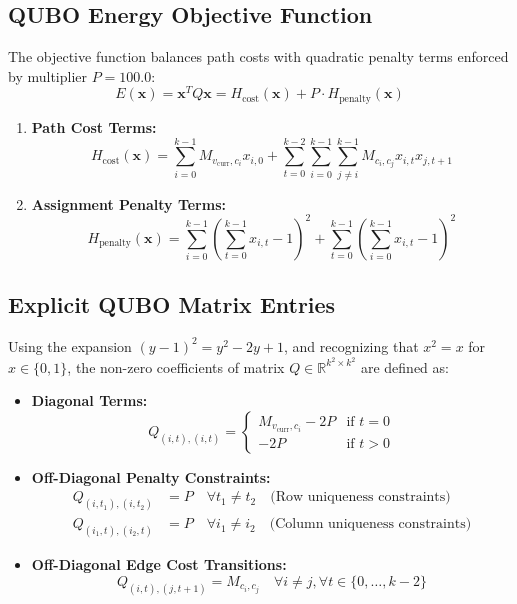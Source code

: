 \documentclass[11pt,a4paper]{article}
\begin{document}
\subsection{QUBO Energy Objective Function}
The objective function balances path costs with quadratic penalty terms enforced by multiplier $P = 100.0$:
\begin{equation}
E(\mathbf{x}) = \mathbf{x}^T Q \mathbf{x} = H_{\text{cost}}(\mathbf{x}) + P \cdot H_{\text{penalty}}(\mathbf{x})
\end{equation}

\begin{enumerate}
    \item \textbf{Path Cost Terms:}
    \begin{equation}
    H_{\text{cost}}(\mathbf{x}) = \sum_{i=0}^{k-1} M_{v_{\text{curr}}, c_i} x_{i,0} + \sum_{t=0}^{k-2} \sum_{i=0}^{k-1} \sum_{j \neq i}^{k-1} M_{c_i, c_j} x_{i,t} x_{j,t+1}
    \end{equation}

    \item \textbf{Assignment Penalty Terms:}
    \begin{equation}
    H_{\text{penalty}}(\mathbf{x}) = \sum_{i=0}^{k-1} \left( \sum_{t=0}^{k-1} x_{i,t} - 1 \right)^2 + \sum_{t=0}^{k-1} \left( \sum_{i=0}^{k-1} x_{i,t} - 1 \right)^2
    \end{equation}
\end{enumerate}

\subsection{Explicit QUBO Matrix Entries}
Using the expansion $(y - 1)^2 = y^2 - 2y + 1$, and recognizing that $x^2 = x$ for $x \in \{0, 1\}$, the non-zero coefficients of matrix $Q \in \mathbb{R}^{k^2 \times k^2}$ are defined as:

\begin{itemize}
    \item \textbf{Diagonal Terms:}
    \begin{equation}
    Q_{(i,t), (i,t)} = \begin{cases} M_{v_{\text{curr}}, c_i} - 2P & \text{if } t = 0 \\ -2P & \text{if } t > 0 \end{cases}
    \end{equation}

    \item \textbf{Off-Diagonal Penalty Constraints:}
    \begin{align}
    Q_{(i,t_1), (i,t_2)} &= P \quad \forall t_1 \neq t_2 \quad \text{(Row uniqueness constraints)} \\
    Q_{(i_1,t), (i_2,t)} &= P \quad \forall i_1 \neq i_2 \quad \text{(Column uniqueness constraints)}
    \end{align}

    \item \textbf{Off-Diagonal Edge Cost Transitions:}
    \begin{equation}
    Q_{(i,t), (j,t+1)} = M_{c_i, c_j} \quad \forall i \neq j, \forall t \in \{0, \dots, k-2\}
    \end{equation}
\end{itemize}
\end{document}
